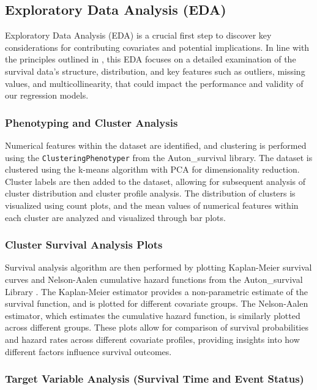 \subsection{Exploratory Data Analysis (EDA)}

Exploratory Data Analysis (EDA) is a crucial first step to discover key considerations for contributing covariates and potential implications. In line with the principles outlined in \parencite{harrell__regression_2015}, this EDA focuses on a detailed examination of the survival data's structure, distribution, and key features such as outliers, missing values, and multicollinearity, that could impact the performance and validity of our regression models.

\subsubsection*{Phenotyping and Cluster Analysis}

Numerical features within the dataset are identified, and clustering is performed using the \texttt{ClusteringPhenotyper} from the Auton\_survival \parencite{nagpal_auton-survival_2022} library. The dataset is clustered using the k-means algorithm with PCA for dimensionality reduction. Cluster labels are then added to the dataset, allowing for subsequent analysis of cluster distribution and cluster profile analysis. The distribution of clusters is visualized using count plots, and the mean values of numerical features within each cluster are analyzed and visualized through bar plots.

\subsubsection*{Cluster Survival Analysis Plots}

Survival analysis algorithm are then performed by plotting Kaplan-Meier survival curves and Nelson-Aalen cumulative hazard functions from the Auton\_survival Library \parencite{nagpal_auton-survival_2022}. The Kaplan-Meier estimator provides a non-parametric estimate of the survival function, and is plotted for different covariate groups. The Nelson-Aalen estimator, which estimates the cumulative hazard function, is similarly plotted across different groups. These plots allow for comparison of survival probabilities and hazard rates across different covariate profiles, providing insights into how different factors influence survival outcomes.


\subsubsection*{Target Variable Analysis (Survival Time and Event Status)}

